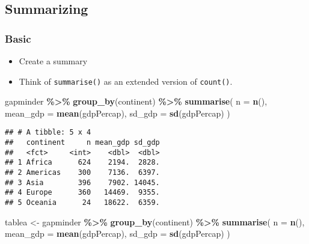 \documentclass[
]{book}
\newenvironment{Shaded}{\begin{snugshade}}{\end{snugshade}}
\newcommand{\DataTypeTok}[1]{\textcolor[rgb]{0.13,0.29,0.53}{#1}}
\newcommand{\KeywordTok}[1]{\textcolor[rgb]{0.13,0.29,0.53}{\textbf{#1}}}
\newcommand{\NormalTok}[1]{#1}
\newcommand{\OperatorTok}[1]{\textcolor[rgb]{0.81,0.36,0.00}{\textbf{#1}}}
\newcommand{\StringTok}[1]{\textcolor[rgb]{0.31,0.60,0.02}{#1}}
\providecommand{\tightlist}{%
  \setlength{\itemsep}{0pt}\setlength{\parskip}{0pt}}
\begin{document}
\hypertarget{summarizing}{%
\subsection{Summarizing}\label{summarizing}}

\hypertarget{basic}{%
\subsubsection{Basic}\label{basic}}

\begin{itemize}
\tightlist
\item
  Create a summary
\item
  Think of \texttt{summarise()} as an extended version of \texttt{count()}.
\end{itemize}

\begin{Shaded}
\begin{Highlighting}[]
\NormalTok{gapminder }\OperatorTok{\%\textgreater{}\%}
\StringTok{  }\KeywordTok{group\_by}\NormalTok{(continent) }\OperatorTok{\%\textgreater{}\%}
\StringTok{  }\KeywordTok{summarise}\NormalTok{(}
    \DataTypeTok{n =} \KeywordTok{n}\NormalTok{(),}
    \DataTypeTok{mean\_gdp =} \KeywordTok{mean}\NormalTok{(gdpPercap),}
    \DataTypeTok{sd\_gdp =} \KeywordTok{sd}\NormalTok{(gdpPercap)}
\NormalTok{  )}
\end{Highlighting}
\end{Shaded}

\begin{verbatim}
## # A tibble: 5 x 4
##   continent     n mean_gdp sd_gdp
##   <fct>     <int>    <dbl>  <dbl>
## 1 Africa      624    2194.  2828.
## 2 Americas    300    7136.  6397.
## 3 Asia        396    7902. 14045.
## 4 Europe      360   14469.  9355.
## 5 Oceania      24   18622.  6359.
\end{verbatim}

\begin{Shaded}
\begin{Highlighting}[]
\NormalTok{tablea \textless{}{-}}\StringTok{ }\NormalTok{gapminder }\OperatorTok{\%\textgreater{}\%}
\StringTok{  }\KeywordTok{group\_by}\NormalTok{(continent) }\OperatorTok{\%\textgreater{}\%}
\StringTok{  }\KeywordTok{summarise}\NormalTok{(}
    \DataTypeTok{n =} \KeywordTok{n}\NormalTok{(),}
    \DataTypeTok{mean\_gdp =} \KeywordTok{mean}\NormalTok{(gdpPercap),}
    \DataTypeTok{sd\_gdp =} \KeywordTok{sd}\NormalTok{(gdpPercap)}
\NormalTok{  )}
\end{Highlighting}
\end{Shaded}
\end{document}
